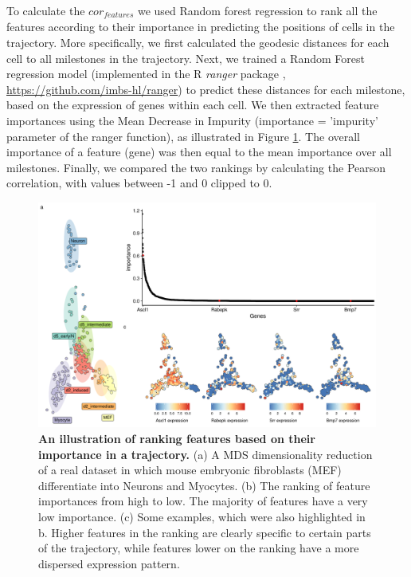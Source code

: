 To calculate the $\textit{cor}_{\textit{features}}$ we used Random forest regression to rank all the features according to their importance in predicting the positions of cells in the trajectory. More specifically, we first calculated the geodesic distances for each cell to all milestones in the trajectory. Next, we trained a Random Forest regression model (implemented in the R \textit{ranger} package \cite{wright_rangerfastimplementation_2017}, \href{https://github.com/imbs-hl/ranger}{https://github.com/imbs-hl/ranger}) to predict these distances for each milestone, based on the expression of genes within each cell. We then extracted feature importances using the Mean Decrease in Impurity (importance = 'impurity' parameter of the ranger function), as illustrated in Figure \ref{fig:snote1fig_8}. The overall importance of a feature (gene) was then equal to the mean importance over all milestones. Finally, we compared the two rankings by calculating the Pearson correlation, with values between -1 and 0 clipped to 0.

\begin{figure}[tbh!]
	\centering\includegraphics[width=\linewidth]{fig/snote1fig_8.pdf}
	\caption{
		\textbf{An illustration of ranking features based on their importance in a trajectory.} 
		(a) A MDS dimensionality reduction of a real dataset in which mouse embryonic fibroblasts (MEF) differentiate into Neurons and Myocytes. (b) The ranking of feature importances from high to low. The majority of features have a very low importance. (c) Some examples, which were also highlighted in b. Higher features in the ranking are clearly specific to certain parts of the trajectory, while features lower on the ranking have a more dispersed expression pattern.
	}
	\label{fig:snote1fig_8}
\end{figure}

